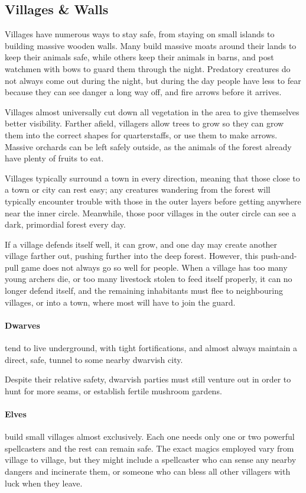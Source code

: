 \begin{multicols}{2}
\subsection{Villages \& Walls}

Villages have numerous ways to stay safe, from staying on small islands to building massive wooden walls.
Many build massive moats around their lands to keep their animals safe, while others keep their animals in barns, and post watchmen with bows to guard them through the night.
Predatory creatures do not always come out during the night, but during the day people have less to fear because they can see danger a long way off, and fire arrows before it arrives.

Villages almost universally cut down all vegetation in the area to give themselves better visibility.
Farther afield, villagers allow trees to grow so they can grow them into the correct shapes for quarterstaffs, or use them to make arrows.
Massive orchards can be left safely outside, as the animals of the forest already have plenty of fruits to eat.

Villages typically surround a town in every direction, meaning that those close to a town or city can rest easy;
any creatures wandering from the forest will typically encounter trouble with those in the outer layers before getting anywhere near the inner circle.
Meanwhile, those poor villages in the outer circle can see a dark, primordial forest every day.

If a village defends itself well, it can grow, and one day may create another village farther out, pushing further into the deep forest.
However, this push-and-pull game does not always go so well for people.
When a village has too many young archers die, or too many livestock stolen to feed itself properly, it can no longer defend itself, and the remaining inhabitants must flee to neighbouring villages, or into a town, where most will have to join the \gls{guard}.

\paragraph{Dwarves} tend to live underground, with tight fortifications, and almost always maintain a direct, safe, tunnel to some nearby dwarvish city.

Despite their relative safety, dwarvish parties must still venture out in order to hunt for more seams, or establish fertile mushroom gardens.

\paragraph{Elves} build small villages almost exclusively.
Each one needs only one or two powerful spellcasters and the rest can remain safe.
The exact magics employed vary from village to village, but they might include a spellcaster who can sense any nearby dangers and incinerate them, or someone who can bless all other villagers with luck when they leave.


\end{multicols}
